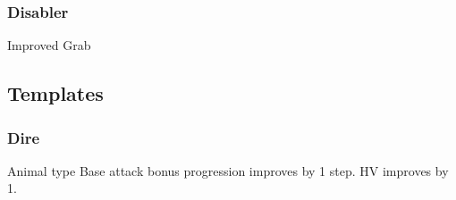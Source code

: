 \subsubsection{Disabler}
\begin{itemize*}
    \item Improved Grab
\end{itemize*}

\subsection{Templates}
\subsubsection{Dire}
\featpre Animal type
\featben Base attack bonus progression improves by 1 step. HV improves by 1.
